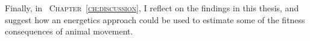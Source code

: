 \medskip

Finally, in {\scshape~Chapter~\ref{ch:discussion}}, I reflect on the findings in this thesis, and suggest how an energetics approach could be used to estimate some of the fitness consequences of animal movement.


\endgroup

{ \begin{center}  \end{center} }

\vfill

\cleardoublepage
